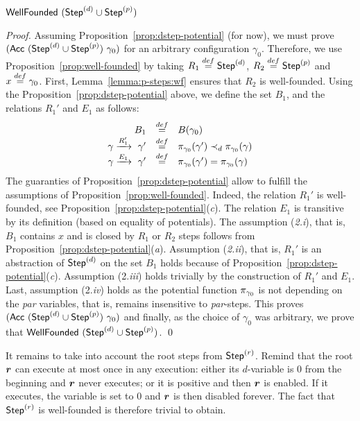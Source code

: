 \begin{lemma}\label{lemma:dp-steps:wf}
  $\mathsf{WellFounded}~ (\mathsf{Step}^{(d)} \cup \mathsf{Step}^{(p)})$
\end{lemma}
\begin{proof}
  Assuming Proposition~\ref{prop:dstep-potential} (for now), we must
  prove $(\mathsf{Acc}~(\mathsf{Step}^{(d)} \cup \mathsf{Step}^{(p)})~\gamma_0)$ for an arbitrary
  configuration $\gamma_0$. Therefore, we use
  Proposition~\ref{prop:well-founded} by taking $R_1 \stackrel{def}= \mathsf{Step}^{(d)}$,
  $R_2 \stackrel{def}= \mathsf{Step}^{(p)}$ and $x \stackrel{def}= \gamma_0$.  First,
  Lemma~\ref{lemma:p-steps:wf} ensures that $R_2$ is well-founded.
  Using the Proposition~\ref{prop:dstep-potential} above, we define
  the set $B_1$, and the relations $R_1'$ and $E_1$ as
  follows:
  \[ \begin{array}{rcl} B_1 & \stackrel{def}= &
    B(\gamma_0) \\ \gamma \xrightarrow{R_1'}~\gamma' & \stackrel{def}=
    & \pi_{\gamma_0}(\gamma') \prec_d \pi_{\gamma_0}(\gamma) \\
    \gamma \xrightarrow{E_1}
    ~\gamma'& \stackrel{def}= & \pi_{\gamma_0}(\gamma')
    = \pi_{\gamma_0}(\gamma) \end{array} \]
  The guaranties of Proposition~\ref{prop:dstep-potential} allow to
  fulfill the assumptions of Proposition~\ref{prop:well-founded}.
  Indeed, the relation $R_1'$ is well-founded, see
  Proposition~\ref{prop:dstep-potential}(\textit{c}).  The relation
  $E_1$ is transitive by its definition (based on equality of
  potentials).  The assumption (\textit{2.i}), that is, $B_1$ contains
  $x$ and is closed by $R_1$ or $R_2$ steps follows from
  Proposition~\ref{prop:dstep-potential}(\textit{a}).  Assumption
  (\textit{2.ii}), that is, $R_1'$ is an abstraction of $\mathsf{Step}^{(d)}$ on
  the set $B_1$ holds because of
  Proposition~\ref{prop:dstep-potential}(\textit{c}).  Assumption
  (2.\textit{iii}) holds trivially by the construction of $R_1'$ and
  $E_1$. Last, assumption (2.\textit{iv}) holds as the potential
  function $\pi_{\gamma_0}$ is not depending on the \textit{par}
  variables, that is, remains insensitive to \textit{par}-steps.
  This proves $(\mathsf{Acc}~(\mathsf{Step}^{(d)} \cup \mathsf{Step}^{(p)})~\gamma_0)$ and 
  finally, as the choice of $\gamma_0$ was arbitrary, we
  prove that $\mathsf{WellFounded}~ (\mathsf{Step}^{(d)} \cup \mathsf{Step}^{(p)})$. \qed
\end{proof} 

It remains to take into account the root steps from $\mathsf{Step}^{(r)}$.
Remind that the root $\boldsymbol{r}$ can execute at most once in any
execution: either its $d$-variable is 0 from the beginning and
$\boldsymbol{r}$ never executes; or it is positive and then $\boldsymbol{r}$ is enabled.
If it executes, the variable is set to 0 and $\boldsymbol{r}$ is then disabled
forever. The fact that $\mathsf{Step}^{(r)}$ is well-founded is therefore trivial
to obtain.  


